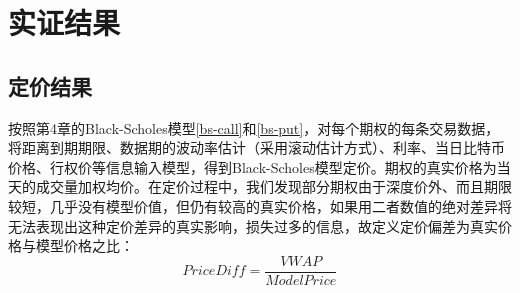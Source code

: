 \chapter{实证结果}
\section{定价结果}
按照第4章的Black-Scholes模型\ref{bs-call}和\ref{bs-put}，对每个期权的每条交易数据，将距离到期期限、数据期的波动率估计（采用滚动估计方式）、利率、当日比特币价格、行权价等信息输入模型，得到Black-Scholes模型定价。期权的真实价格为当天的成交量加权均价。在定价过程中，我们发现部分期权由于深度价外、而且期限较短，几乎没有模型价值，但仍有较高的真实价格，如果用二者数值的绝对差异将无法表现出这种定价差异的真实影响，损失过多的信息，故定义定价偏差为真实价格与模型价格之比：
\begin{equation}
    Price Diff=\frac{VWAP}{Model Price}
    \label{eq:diff}
\end{equation}

